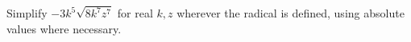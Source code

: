 Simplify $-3k^5\sqrt{8k^7z^7}$ for real $k,z$ wherever the radical is defined, using absolute values where necessary.

